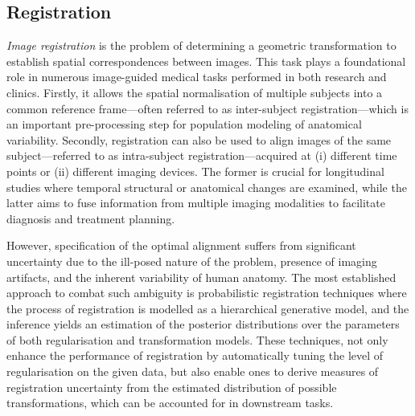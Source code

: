 \subsection*{Registration}
\textit{Image registration} is the problem of determining a geometric transformation to establish spatial correspondences between images. This task plays a foundational role in numerous image-guided medical tasks \cite{maintz1998survey,glocker2011deformable,sotiras2013deformable} performed in both research and clinics. Firstly, it allows the spatial normalisation of multiple subjects into a common reference frame---often referred to as inter-subject registration---which is an important pre-processing step for population modeling of anatomical variability. Secondly, registration can also be used to align images of the same subject---referred to as intra-subject registration---acquired at (i) different time points or (ii) different imaging devices. The former is crucial for longitudinal studies where temporal structural or anatomical changes are examined, while the latter aims to fuse information from multiple imaging modalities to facilitate diagnosis and treatment planning. 

However, specification of the optimal alignment suffers from significant uncertainty due to the ill-posed nature of the problem, presence of imaging artifacts, and the inherent variability of human anatomy. The most established approach to combat such ambiguity is probabilistic registration techniques \cite{van2008encoding,risholm2010summarizing,cobzas2011random,lotfi2013improving,simpson2012probabilistic,risholm2013bayesian,popuri2013variational,zhang2013bayesian,wassermann2014probabilistic,simpson2015probabilistic,heinrich2016deformable,le2016quantifying} where the process of registration is modelled as a hierarchical generative model, and the inference yields an estimation of the posterior distributions over the parameters of both regularisation and transformation models. These techniques, not only enhance the performance of registration by automatically tuning the level of regularisation on the given data, but also enable ones to derive measures of registration uncertainty from the estimated distribution of possible transformations, which can be accounted for in downstream tasks.

